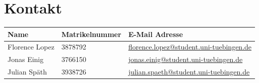 \documentclass[%
   10pt,              %
   a4paper,           %
   DIV10,             %
]{scrartcl}%
\begin{document}
\section*{Kontakt}
\centering
\begin{tabular}{lll}
\toprule
Name & Matrikelnummer & E-Mail Adresse \\
\midrule
Florence Lopez & 3878792  &  \href{mailto:florence.lopez@student.uni-tuebingen.de}{florence.lopez@student.uni-tuebingen.de} \\
Jonas Einig  & 3766150    & \href{mailto:jonas.einig@student.uni-tuebingen.de}{jonas.einig@student.uni-tuebingen.de}    \\
Julian Späth  & 3938726    & \href{mailto:julian.spaeth@student.uni-tuebingen.de}{julian.spaeth@student.uni-tuebingen.de}    \\
\bottomrule
\end{tabular}



\end{document}

